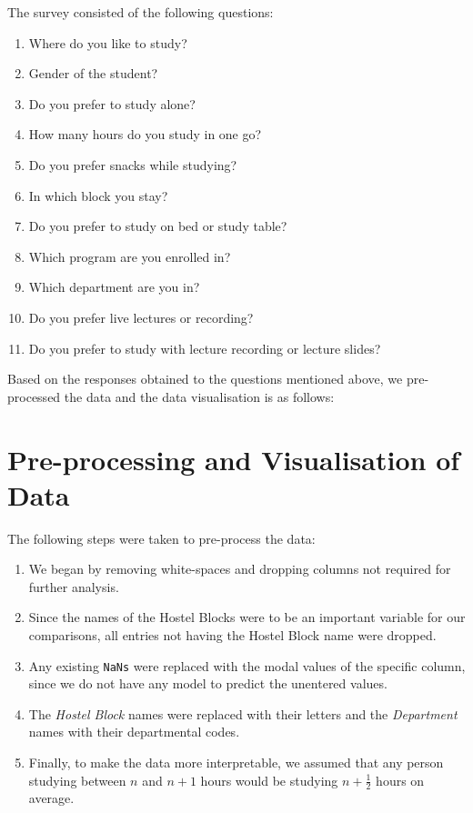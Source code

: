 \documentclass[12pt,onecolumn,letterpaper]{article}
\begin{document}
The survey consisted of the following questions:
\begin{enumerate}
\item Where do you like to study?
\item Gender of the student?
\item Do you prefer to study alone?
\item How many hours do you study in one go?
\item Do you prefer snacks while studying?
\item In which block you stay?
\item Do you prefer to study on bed or study table?
\item Which program are you enrolled in?
\item Which department are you in?
\item Do you prefer live lectures or recording?
\item Do you prefer to study with lecture recording or lecture slides?
\end{enumerate}

\hspace{0.3in} Based on the responses obtained to the questions mentioned above, we pre-processed the data and the data visualisation is as follows:


\section {Pre-processing and Visualisation of Data}
The following steps were taken to pre-process the data:
\begin{enumerate}
    \item We began by removing white-spaces and dropping columns not required for further analysis.
    \item Since the names of the Hostel Blocks were to be an important variable for our comparisons, all entries not having the Hostel Block name were dropped.
    \item Any existing \texttt{NaNs} were replaced with the modal values of the specific column, since we do not have any model to predict the unentered values.
    \item The \textit{Hostel Block} names were replaced with their letters and the \textit{Department} names with their departmental codes.
    \item Finally, to make the data more interpretable, we assumed that any person studying between $n$ and $n+1$ hours would be studying $n + \frac{1}{2}$ hours on average.
\end{enumerate}
\end{document}
